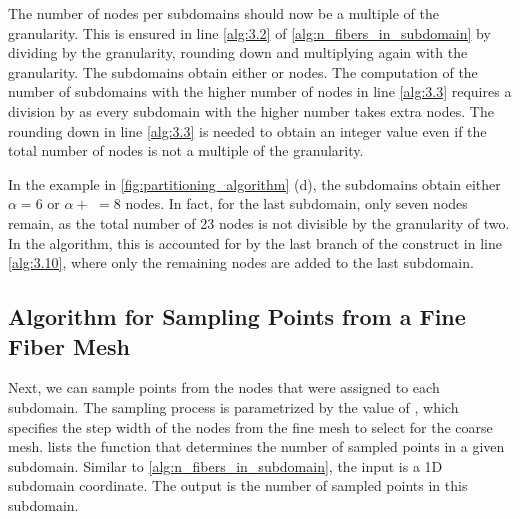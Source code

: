 The number of nodes per subdomains should now be a multiple of the granularity. This is ensured in line \ref{alg:3.2} of \cref{alg:n_fibers_in_subdomain} by dividing by the granularity, rounding down and multiplying again with the granularity. The subdomains obtain either \code{$\alpha$} or  nodes. The computation of the number  of subdomains with the higher number of nodes in line \ref{alg:3.3} requires a division by  as every subdomain with the higher number takes  extra nodes. The rounding down in line \ref{alg:3.3} is needed to obtain an integer value even if the total number of nodes is not a multiple of the granularity.

In the example in \cref{fig:partitioning_algorithm} (d), the subdomains obtain either $\alpha=6$ or $\alpha +$ $=8$ nodes. In fact, for the last subdomain, only seven nodes remain, as the total number of 23 nodes is not divisible by the granularity of two.
In the algorithm, this is accounted for by the last branch of the  construct in line \ref{alg:3.10}, where only the remaining nodes are added to the last subdomain.

\subsection{Algorithm for Sampling Points from a Fine Fiber Mesh}\label{sec:partitioning_alg2}

Next, we can sample points from the nodes that were assigned to each subdomain. The sampling process is parametrized by the value of , which specifies the step width of the nodes from the fine mesh to select for the coarse mesh.
 lists the function that determines the number of sampled points in a given subdomain. Similar to \cref{alg:n_fibers_in_subdomain}, the input is a 1D subdomain coordinate. The output is the number of sampled points in this subdomain.

